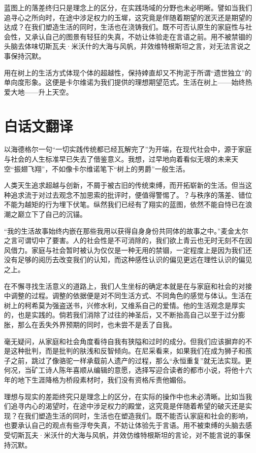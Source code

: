\documentclass[12pt,a4paper]{article}
\begin{document}
蓝图上的落差终归只是理念上的区分，在实践场域的分野也未必明晰。譬如当我们追寻心之所向时，在途中涉足权力的玉墀，这究竟是伴随着期望的泯灭还是期望的达成？在我们塑造生活的同时，生活也在浇铸我们。既不可否认原生的家庭性与社会性，又承认自己的图景有轻狂的失真，不妨让体验走在言语之前。用不被禁锢的头脑去体味切斯瓦夫·米沃什的大海与风帆，并效维特根斯坦之言，对无法言说之事保持沉默。

用在树上的生活方式体现个体的超越性，保持婞直却又不拘泥于所谓“遗世独立”的单向度形象。这便是卡尔维诺为我们提供的理想期望范式。生活在树上——始终热爱大地——升上天空。

\section*{白话文翻译}
以海德格尔一句“一切实践传统都已经瓦解完了”为开端，在现代社会中，源于家庭与社会的人生标准早已失去了借鉴意义。我想，过早地向着看似无垠的未来天空“振翅飞翔”，不如像卡尔维诺笔下“树上的男爵”一般生活。

人类天生追求超越与创新，不屑于被古旧的传统束缚，而开拓崭新的生活。但当这种追求流于对过去观念不加思索的批评时，便值得警惕了。？与秩序的落差、错位不能为越矩的行为埋下伏笔。纵然我们已经有了翔实的蓝图，依然不能自恃已在浪潮之巅立下了自己的沉锚。

“我的生活故事始终内嵌在那些我用以获得自身身份共同体的故事之中。”麦金太尔之言可谓切中了要害。人的社会性是不可消除的，我们欲上青云也无时无刻不在因风借力。家庭与社会暂时被认为仅仅是一种无用的禁锢，一定程度上是因为我们还没有足够的阅历去改变我们的认知，而这种感性认识的偏见更远在理性认识的偏见之上。

在不懈寻找生活意义的道路上，我们人生坐标的确定本就是在与家庭和社会的对接中调整的过程。调整的依据便是对不同生活方式、不同角色的感觉与体认。生活在树上的柯希莫为强盗送书，兴修水利，又维系自己的爱情。他的生活观念是厚实的，也是实践的。倘若我们消除了过往的神圣后，又不断抬高自己以至于过分膨胀，那么在丢失外界预期的同时，也未尝不是丢了自我。

毫无疑问，从家庭和社会角度看待自我有狭隘和过时的成分。但我们应该摒弃的不是这种批判，而是批判的肤浅和反智倾向。在尼采看来，如果我们在成为狮子和孩子之前，跳过了像骆驼一样承载前人遗产的过程，那么“永恒重复”就无法实现。更何况，当矿工诗人陈年喜顺从编辑的意愿，选择写迎合读者的都市小说，将他十六年的地下生涯降格为桥段素材时，我们没有资格斥责他媚俗。

理想与现实的差距终究只是理念上的区分，在实际的操作中也未必清晰。比如当我们追寻内心的渴望时，在途中涉足权力的殿堂，这究竟是伴随着希望的破灭还是实现？在我们塑造生活的同时，生活也在塑造我们。既不能否认家庭和社会的影响，也要承认自己的观点有些浮夸失真，不妨让体验先于言语。用不被束缚的头脑去感受切斯瓦夫·米沃什的大海与风帆，并效仿维特根斯坦的言论，对不能言说的事保持沉默。
\end{document}
